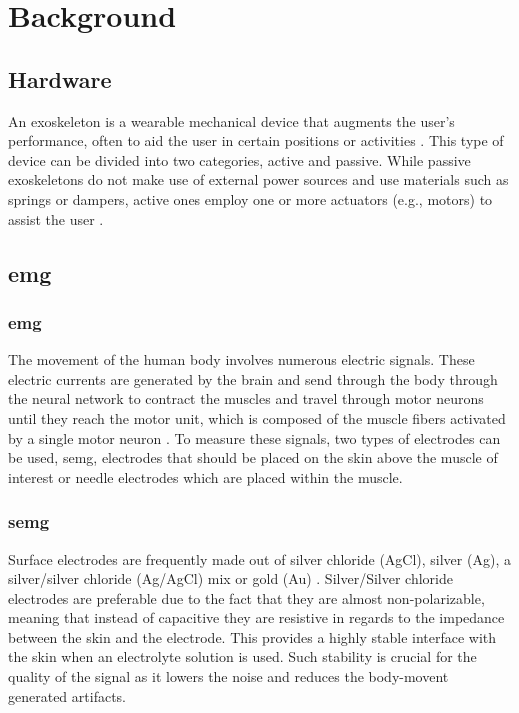 \section{Background}
\label{section:background}

\subsection{Hardware}

An exoskeleton is a wearable mechanical device that augments the user's performance, often to aid the user in certain positions or activities \cite{exodefinition}. This type of device can be divided into two
categories, active and passive. While passive exoskeletons do not make use of external power sources and use materials
such as springs or dampers, active ones employ one or more actuators (e.g., motors) to assist the user \cite{passiveactiveexo}.


\subsection{\acrfull{emg}}

\subsubsection{\acrshort{emg}}

The movement of the human body involves numerous electric signals. These electric currents are generated by the brain and send through the body through the neural network
to contract the muscles and travel through motor neurons until they reach the motor unit, which is composed of the muscle fibers
activated by a single motor neuron \cite{emggen}. To measure these signals, two types of electrodes can be used, \acrfull{semg}, 
electrodes that should be placed on the skin above the muscle of interest or needle electrodes which are placed within 
the muscle. 

\subsubsection{\acrshort{semg}}

Surface electrodes are frequently made out of silver chloride (AgCl), silver (Ag), a silver/silver chloride (Ag/AgCl) mix or gold (Au) \cite{sEMG}.
Silver/Silver chloride electrodes are preferable due to the fact that they are almost non-polarizable, meaning that instead of capacitive
they are resistive in regards to the impedance between the skin and the electrode. This provides a highly stable interface with the skin when 
an electrolyte solution is used. Such stability is crucial for the quality of the signal as it lowers the noise and reduces the body-movent generated
artifacts.

